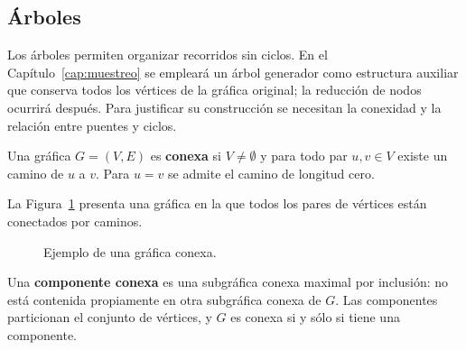 \subsection{Árboles}

Los árboles permiten organizar recorridos sin ciclos. En el Capítulo~\ref{cap:muestreo} se empleará un árbol generador como estructura auxiliar que conserva todos los vértices de la gráfica original; la reducción de nodos ocurrirá después. Para justificar su construcción se necesitan la conexidad y la relación entre puentes y ciclos.

\begin{definition}
\label{def:grafica-conexa}
Una gráfica $G=(V,E)$ es \textbf{conexa} si $V\neq\emptyset$ y para todo par $u,v\in V$ existe un camino de $u$ a $v$. Para $u=v$ se admite el camino de longitud cero.
\end{definition}

La Figura~\ref{fig:conexa} presenta una gráfica en la que todos los pares de vértices están conectados por caminos.

\begin{figure}[H]
    \centering
    \caption{Ejemplo de una gráfica conexa.}
    \label{fig:conexa}
\end{figure}

Una \textbf{componente conexa} es una subgráfica conexa maximal por inclusión: no está contenida propiamente en otra subgráfica conexa de $G$. Las componentes particionan el conjunto de vértices, y $G$ es conexa si y sólo si tiene una componente.

